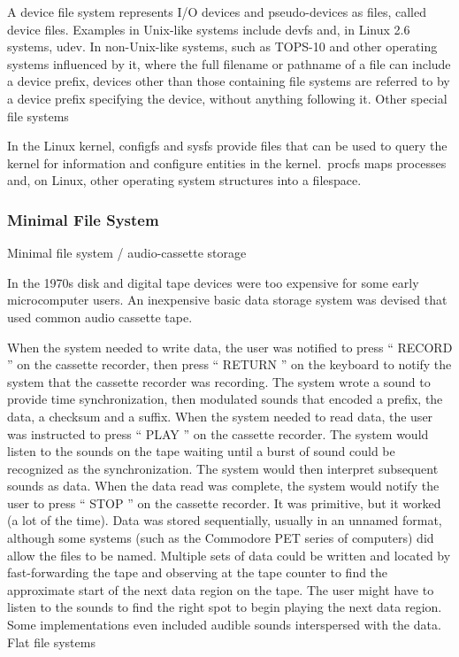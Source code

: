 A device file system represents I/O devices and pseudo-devices as files, called
device files. Examples in Unix-like systems include devfs and, in Linux 2.6
systems, udev. In non-Unix-like systems, such as TOPS-10 and other operating
systems influenced by it, where the full filename or pathname of a file can
include a device prefix, devices other than those containing file systems are
referred to by a device prefix specifying the device, without anything following
it.  Other special file systems



	In the Linux kernel, configfs and sysfs provide files that can be used to
	query the kernel for information and configure entities in the kernel.\
	procfs maps processes and, on Linux, other operating system structures into
	a filespace.

	

\subsubsectionend


\subsubsection{Minimal File System}
\label{sssec:minimal_file_system}

Minimal file system / audio-cassette storage



In the 1970s disk and digital tape devices were too expensive for some early
microcomputer users. An inexpensive basic data storage system was devised that
used common audio cassette tape.



When the system needed to write data, the user was notified to press `` RECORD
'' on the cassette recorder, then press `` RETURN '' on the keyboard to notify
the system that the cassette recorder was recording. The system wrote a sound to
provide time synchronization, then modulated sounds that encoded a prefix, the
data, a checksum and a suffix. When the system needed to read data, the user was
instructed to press `` PLAY '' on the cassette recorder. The system would listen
to the sounds on the tape waiting until a burst of sound could be recognized as
the synchronization. The system would then interpret subsequent sounds as data.
When the data read was complete, the system would notify the user to press ``
STOP '' on the cassette recorder. It was primitive, but it worked (a lot of the
time). Data was stored sequentially, usually in an unnamed format, although some
systems (such as the Commodore PET series of computers) did allow the files to
be named.  Multiple sets of data could be written and located by fast-forwarding
the tape and observing at the tape counter to find the approximate start of the
next data region on the tape. The user might have to listen to the sounds to
find the right spot to begin playing the next data region. Some implementations
even included audible sounds interspersed with the data.  Flat file systems
	



